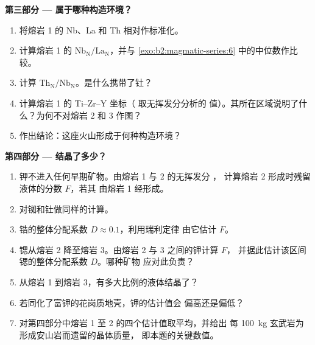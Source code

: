 \begin{problem}
\noindent\textbf{第三部分 --- 属于哪种构造环境？}
\begin{enumerate}[resume]
\item 将熔岩 1 的 Nb、La 和 Th 相对作标准化。
\item 计算熔岩 1 的 $\mathrm{Nb_N}/\mathrm{La_N}$，并与
\cref{exo:b2:magmatic-series:6} 中的中位数作比较。
\item 计算 $\mathrm{Th_N}/\mathrm{Nb_N}$。是什么携带了钍？
\item 计算熔岩 1 的 Ti--Zr--Y 坐标（ 取无挥发分分析的
值）。其所在区域说明了什么？为何不对熔岩 2 和 3 作图？
\item 作出结论：这座火山形成于何种构造环境？
\end{enumerate}

\noindent\textbf{第四部分 --- 结晶了多少？}
\begin{enumerate}[resume]
\item 钾不进入任何早期矿物。由熔岩 1 与 2 的无挥发分 ，
计算熔岩 2 形成时残留液体的分数 $F$，若其
由熔岩 1 经形成。
\item 对铷和钍做同样的计算。
\item 锆的整体分配系数 $D \approx 0.1$，利用瑞利定律
由它估计 $F$。
\item 锶从熔岩 2 降至熔岩 3。由熔岩 2 与 3 之间的钾计算 $F$，
并据此估计该区间锶的整体分配系数 $D$。哪种矿物
应对此负责？
\item 从熔岩 1 到熔岩 3，有多大比例的液体结晶了？
\item 若同化了富钾的花岗质地壳，钾的估计值会
偏高还是偏低？
\item 对第四部分中熔岩 1 至 2 的四个估计值取平均，并给出
每 \qty{100}{kg} 玄武岩为形成安山岩而遗留的晶体质量，
即本题的关键数值。
\end{enumerate}
\end{problem}
